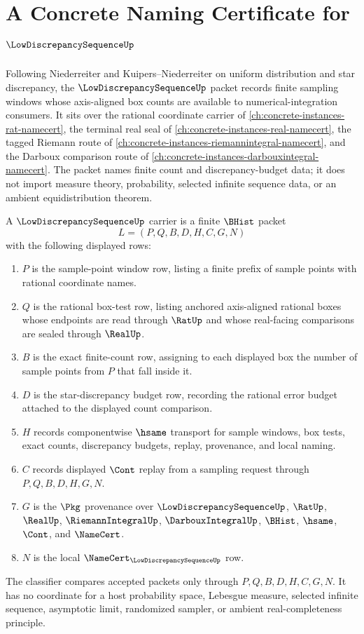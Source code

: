 \chapter{A Concrete Naming Certificate for $\LowDiscrepancySequenceUp$}
\label{ch:concrete-instances-low-discrepancy-sequence-namecert}

Following Niederreiter and Kuipers--Niederreiter on uniform distribution and star discrepancy, the $\LowDiscrepancySequenceUp$ packet records finite sampling windows whose axis-aligned box counts are available to numerical-integration consumers. It sits over the rational coordinate carrier of \autoref{ch:concrete-instances-rat-namecert}, the terminal real seal of \autoref{ch:concrete-instances-real-namecert}, the tagged Riemann route of \autoref{ch:concrete-instances-riemannintegral-namecert}, and the Darboux comparison route of \autoref{ch:concrete-instances-darbouxintegral-namecert}. The packet names finite count and discrepancy-budget data; it does not import measure theory, probability, selected infinite sequence data, or an ambient equidistribution theorem.

\begin{definition}
\label{def:low-discrepancy-sequence-carrier}
A $\LowDiscrepancySequenceUp$ carrier is a finite $\BHist$ packet
$$
L=(P,Q,B,D,H,C,G,N)
$$
with the following displayed rows:
\begin{enumerate}
\item $P$ is the sample-point window row, listing a finite prefix of sample points with rational coordinate names.
\item $Q$ is the rational box-test row, listing anchored axis-aligned rational boxes whose endpoints are read through $\RatUp$ and whose real-facing comparisons are sealed through $\RealUp$.
\item $B$ is the exact finite-count row, assigning to each displayed box the number of sample points from $P$ that fall inside it.
\item $D$ is the star-discrepancy budget row, recording the rational error budget attached to the displayed count comparison.
\item $H$ records componentwise $\hsame$ transport for sample windows, box tests, exact counts, discrepancy budgets, replay, provenance, and local naming.
\item $C$ records displayed $\Cont$ replay from a sampling request through $P,Q,B,D,H,G,N$.
\item $G$ is the $\Pkg$ provenance over $\LowDiscrepancySequenceUp$, $\RatUp$, $\RealUp$, $\RiemannIntegralUp$, $\DarbouxIntegralUp$, $\BHist$, $\hsame$, $\Cont$, and $\NameCert$.
\item $N$ is the local $\NameCert_{\LowDiscrepancySequenceUp}$ row.
\end{enumerate}
The classifier compares accepted packets only through $P,Q,B,D,H,C,G,N$. It has no coordinate for a host probability space, Lebesgue measure, selected infinite sequence, asymptotic limit, randomized sampler, or ambient real-completeness principle.
\end{definition}

